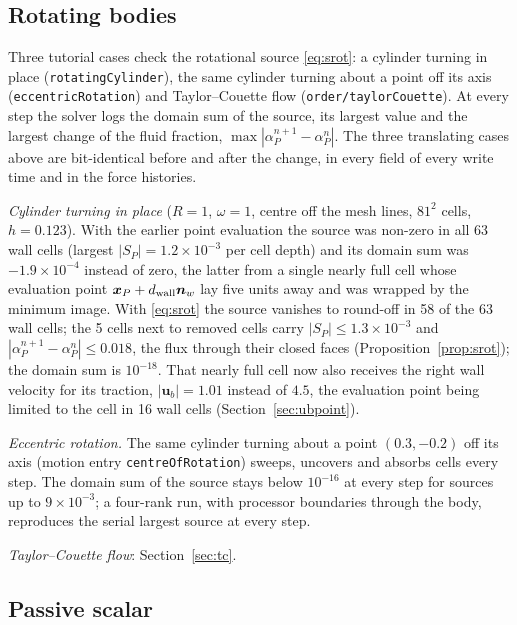 \documentclass[11pt,a4paper]{article}
\theoremstyle{remark}
\newcommand{\uu}{\bm{u}}
\newcommand{\ub}{\uu_b}
\newcommand{\nn}{\bm{n}}
\newcommand{\xx}{\bm{x}}
\newcommand{\dw}{d_{\rm wall}}
\newcommand{\code}[1]{\texttt{#1}}
\begin{document}
\subsection{Rotating bodies}
\label{sec:verifmoving}

\begin{sloppypar}
Three tutorial cases check the rotational source \eqref{eq:srot}: a cylinder turning in place
(\code{rotatingCylinder}), the same cylinder turning about a point off its axis
(\code{eccentricRotation}) and Taylor--Couette flow
(\code{order/taylorCouette}).
At every step the solver logs the domain sum of the source, its largest value and the largest
change of the fluid fraction, $\max|\alpha^{n+1}_P-\alpha^n_P|$. The three translating cases above
are bit-identical before and after the change, in every field of every write time and in the
force histories.
\end{sloppypar}

\emph{Cylinder turning in place} ($R=1$, $\omega=1$, centre off the mesh lines, $81^2$ cells,
$h=0.123$). With the earlier point evaluation the source was non-zero in all 63 wall cells
(largest $|S_P|=1.2\times10^{-3}$ per cell depth) and its domain sum was $-1.9\times10^{-4}$
instead of zero, the latter from a single nearly full cell whose evaluation point
$\xx_P+\dw\nn_w$ lay five units away and was wrapped by the minimum image. With \eqref{eq:srot}
the source vanishes to round-off in 58 of the 63 wall cells; the 5 cells next to removed cells
carry $|S_P|\le1.3\times10^{-3}$ and $|\alpha^{n+1}_P-\alpha^n_P|\le0.018$, the flux through
their closed faces (Proposition~\ref{prop:srot}); the domain sum is $10^{-18}$. That nearly full
cell now also receives the right wall velocity for its traction, $|\ub|=1.01$ instead of $4.5$,
the evaluation point being limited to the cell in 16 wall cells (Section~\ref{sec:ubpoint}).

\emph{Eccentric rotation.} The same cylinder turning about a point $(0.3,-0.2)$ off its axis
(motion entry \code{centreOfRotation}) sweeps, uncovers and absorbs cells every step. The domain
sum of the source stays below $10^{-16}$ at every step for sources up to
$9\times10^{-3}$; a four-rank run, with processor boundaries through the body, reproduces the
serial largest source at every step.

\emph{Taylor--Couette flow}: Section~\ref{sec:tc}.

\subsection{Passive scalar}
\label{sec:verifscalar}
\end{document}
